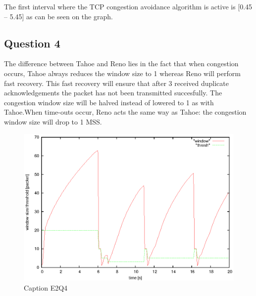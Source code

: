 \documentclass[12pt]{article}
\begin{document}
The first interval where the TCP congestion avoidance algorithm is active is [0.45 – 5.45] as can be seen on the graph.

\subsection*{Question 4}
The difference between Tahoe and Reno lies in the fact that when congestion occurs, Tahoe always reduces the window size to 1 whereas Reno will perform fast recovery. This fast recovery will 
ensure that after 3 received duplicate acknowledgements the packet has not been transmitted succesfully. The congestion window size will be halved instead of lowered to 1 as with Tahoe.When time-outs occur, Reno acts the same way as Tahoe: the congestion window size will drop to 1 MSS.
\begin{figure}[h]
\centerline{\includegraphics{pictures/E2Q4.eps}}
\caption{Caption E2Q4}
\label{ex2:question4}
\end{figure}
\end{document}
